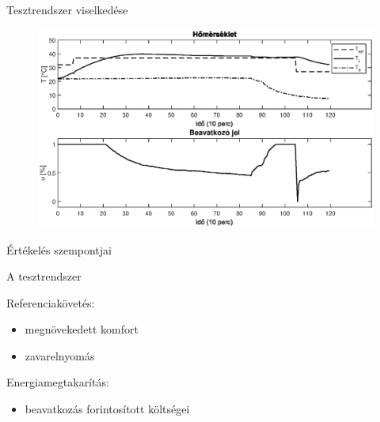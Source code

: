 \documentclass[14pt,handout]{beamer}
\begin{document}
\begin{frame}{Tesztrendszer viselkedése}

\begin{figure}
	\centering
	\includegraphics[width=\textwidth]{picture/4-step.eps}	
\end{figure}

\end{frame}



\begin{frame}{Értékelés szempontjai}

A tesztrendszer

Referenciakövetés:
\begin{itemize}
	\item megnövekedett komfort
	\item zavarelnyomás
\end{itemize}
\vspace{6pt}

Energiamegtakarítás:
\begin{itemize}
	\item beavatkozás forintosított költségei
\end{itemize}

\end{frame}
\end{document}
